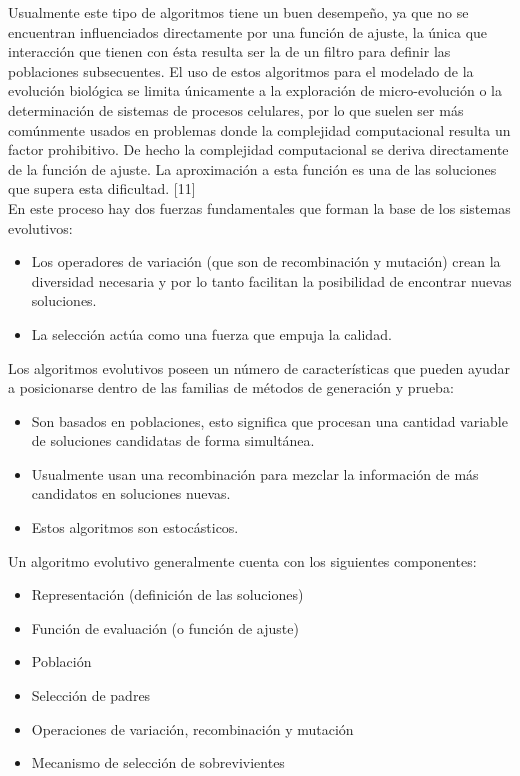 Usualmente este tipo de algoritmos tiene un buen desempeño, ya que no se encuentran influenciados directamente por una función de ajuste, la única que interacción que tienen con ésta resulta ser la de un filtro para definir las poblaciones subsecuentes. El uso de estos algoritmos para el modelado de la evolución biológica se limita únicamente a la exploración de micro-evolución o la determinación de sistemas de procesos celulares, por lo que suelen ser más comúnmente usados en problemas donde la complejidad computacional resulta un factor prohibitivo. De hecho la complejidad computacional se deriva directamente de la función de ajuste. La aproximación a esta función es una de las soluciones que supera esta dificultad. [11] \\

En este proceso hay dos fuerzas fundamentales que forman la base de los sistemas evolutivos: \\
\begin{itemize}
\item Los operadores de variación (que son de recombinación y mutación) crean la diversidad necesaria y por lo tanto facilitan la posibilidad de encontrar nuevas soluciones.
\item La selección actúa como una fuerza que empuja la calidad.
\end{itemize}

Los algoritmos evolutivos poseen un número de características que pueden ayudar a posicionarse dentro de las familias de métodos de generación y prueba:

\begin{itemize}
\item Son basados en poblaciones, esto significa que procesan una cantidad variable de soluciones candidatas de forma simultánea.
\item Usualmente usan una recombinación para mezclar la información de más candidatos en soluciones nuevas.
\item Estos algoritmos son estocásticos.
\end{itemize}


Un algoritmo evolutivo generalmente cuenta con los siguientes componentes:

\begin{itemize}
\item Representación (definición de las soluciones)
\item Función de evaluación (o función de ajuste)
\item Población
\item Selección de padres
\item Operaciones de variación, recombinación y mutación
\item Mecanismo de selección de sobrevivientes 
\end{itemize}


